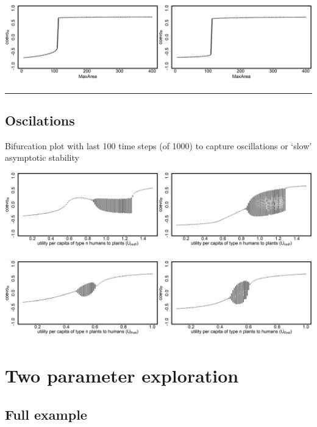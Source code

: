 \documentclass[
]{book}
\begin{document}
\includegraphics[width=1\linewidth]{plots/2_onePar-MaxArea_bifplot-pair}

\begin{center}\rule{0.5\linewidth}{0.5pt}\end{center}

\hypertarget{oscilations}{%
\section{Oscilations}\label{oscilations}}

Bifurcation plot with last 100 time steps (of 1000) to capture oscillations or `slow' asymptotic stability

\includegraphics[width=1\linewidth]{plots/2_onePar-mU.HnP.osc_bifplot-pair}

\includegraphics[width=1\linewidth]{plots/2_onePar-mU.PnH.osc_bifplot-pair}

\hypertarget{two-parameter-exploration}{%
\chapter{Two parameter exploration}\label{two-parameter-exploration}}

\newpage

\hypertarget{full-example}{%
\section{Full example}\label{full-example}}
\end{document}

